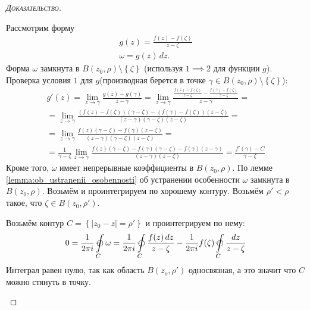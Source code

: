 \documentclass[../complex-analysis.tex]{subfiles}
\begin{document}
\begin{proof}[\normalfont\textsc{Доказательство}]
\begin{itemize}
 Рассмотрим форму
 \begin{align*}
    g(z) = \frac{f(z) - f(\zeta)}{z-\zeta}\\
  \omega = g(z)\,dz.
 \end{align*} 
 Форма $\omega$ замкнута в $B(z_0, \rho) \setminus \left\{ \zeta \right\}$ (используя $1 \implies 2$ для функции $g$).
 Проверка условия $1$  для $g$(производная берется в точке $\gamma \in B(z_0, \rho) \setminus \left\{ \zeta \right\}$):
 \begin{align*}
     g'(z) = \lim_{z \to \gamma} \frac{g(z) - g(\gamma)}{z - \gamma} = 
    \lim_{z \to \gamma} \frac{\frac{f(z) - f(\zeta)}{z - \zeta} - \frac{f(\gamma) - f(\zeta)}{\gamma - \zeta}}{z - \gamma} = \\=
    \lim_{z \to \gamma} \frac{(f(z) - f(\zeta))(\gamma - \zeta) - (f(\gamma) - f(\zeta))(z - \zeta)}{(z - \gamma)(\gamma - \zeta)(z - \zeta)}= \\=
    \lim_{z \to \gamma} \frac{f(z)(\gamma - \zeta) - f(\gamma)(z - \zeta)}{(z - \gamma)(\gamma - \zeta)(z - \zeta)}=\\=
    \frac{1}{\gamma - \zeta} \lim_{z \to \gamma} \frac{f(z)(\gamma - \zeta) - f(\gamma)(\gamma - \zeta) - f(\gamma)(z - \gamma)}{(z - \gamma)(z - \zeta)}=
    \frac{f'(\gamma) - C}{\gamma - \zeta} 
 \end{align*}
 Кроме того, $\omega$ имеет непрерывные коэффициенты в $B(z_0, \rho)$.
 По лемме \ref{lemma:ob_ustranenii_osobennosti} об устранении особенности $\omega$ замкнута в $B(z_0, \rho)$.
 Возьмём и проинтегрируем по хорошему контуру.
 Возьмём $\rho' < \rho$ такое, что $\zeta \in B(z_0, \rho')$.

 Возьмём контур
 $C = \left\{ \left| z_0 - z \right| = \rho' \right\}$
 и проинтегрируем по нему:
 \begin{align*}
  0=\frac{1}{2\pi i} \varointctrclockwise\limits_{C} \omega  = \frac{1}{2\pi i} \varointctrclockwise\limits_{C} \frac{f(z)\,dz}{z - \zeta}  - \frac{1}{2\pi i} f(\zeta) \varointctrclockwise\limits_{C} \frac{dz}{z - \zeta} 
 \end{align*}
 Интеграл равен нулю, так как область $B(z_o, \rho')$ односвязная, а это значит что $C$
 можно стянуть в точку.


\end{itemize}
\end{proof}
\end{document}
